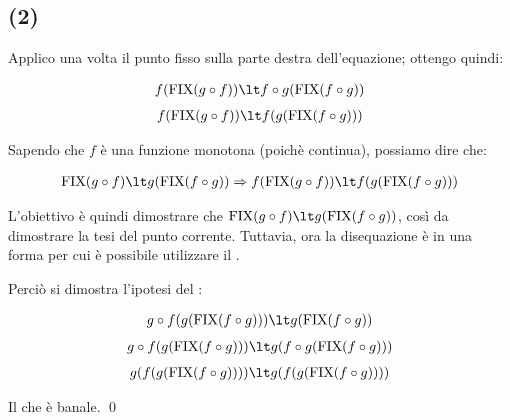 \subsection{(2)}

Applico una volta il punto fisso sulla parte destra dell'equazione; ottengo
quindi:

\begin{align*}
f(\fixp{g \circ f}) \lt f \circ g(\fixp{f \circ g})
\end{align*}
\begin{align*}
f(\fixp{g \circ f}) \lt f(g(\fixp{f \circ g}))
\end{align*}

Sapendo che $f$ è una funzione monotona (poichè continua), possiamo dire che:

\begin{align*}
\fixp{g \circ f} \lt g(\fixp{f \circ g})
\Rightarrow
f(\fixp{g \circ f}) \lt f(g(\fixp{f \circ g}))
\end{align*}

L'obiettivo è quindi dimostrare che $\fixp{g \circ f} \lt g(\fixp{f \circ g})$,
così da dimostrare la tesi del punto corrente. Tuttavia, ora la disequazione è
in una forma per cui è possibile utilizzare il \FPIL.

Perciò si dimostra l'ipotesi del \FPIL:

\begin{align*}
g \circ f(g(\fixp{f \circ g})) \lt g(\fixp{f \circ g})
\end{align*}
\begin{align*}
g \circ f(g(\fixp{f \circ g})) \lt g(f \circ g(\fixp{f \circ g}))
\end{align*}
\begin{align*}
g(f(g(\fixp{f \circ g}))) \lt g(f(g(\fixp{f \circ g})))
\end{align*}

Il che è banale. \qed

\let\lt\undefined
{}
